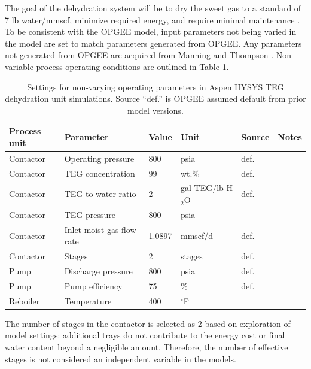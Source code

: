 \documentclass[11pt]{report}
\begin{document}
The goal of the dehydration system will be to dry the sweet gas to a standard of 7 lb water/mmscf, minimize required energy, and require minimal maintenance \cite{Manning1991}. To be consistent with the OPGEE model, input parameters not being varied in the model are set to match parameters generated from OPGEE. Any parameters not generated from OPGEE are acquired from Manning and Thompson \cite{Manning1991}.  Non-variable process operating conditions are outlined in Table \ref{tab:TEG_Aspen_Settings}.

\begin{table}
\begin{scriptsize}
\caption{Settings for non-varying operating parameters in Aspen HYSYS TEG dehydration unit simulations. Source ``def.'' is OPGEE assumed default from prior model versions.}
\label{tab:TEG_Aspen_Settings}
\begin{tabular*}{1\columnwidth}{p{}p{}p{}p{}p{}p{}}
\toprule
Process unit & Parameter & Value & Unit & Source & Notes \\
\midrule
Contactor &	Operating pressure 		&	800 		& 	psia					& def.	 			&\\
Contactor &	TEG concentration 		&	99	 	&	wt.\% 				& def.	 			& \\
Contactor &	TEG-to-water ratio 		&	2 		&	gal TEG/lb H$_2$O 		& def. 				&  \\
Contactor &	TEG pressure 			&	800 		&	psia 					& \cite{Manning1991} 	&\\
Contactor &	Inlet moist gas flow rate 	&	1.0897	&	mmscf/d 				& def.				& \\
Contactor &	Stages 				&	2		&	stages 				& def.				& \\
\midrule
Pump 	&	Discharge pressure		&	800 		&	psia 					& def.		&\\
Pump 	&	Pump efficiency 		&	75 		&	\%					& def.	& \\
\midrule
Reboiler 	&	Temperature 			&	400 		&	$^\circ$F 				&	\cite{Manning1991}	& \\
\bottomrule
\end{tabular*}
\end{scriptsize}
\end{table}

The number of stages in the contactor is selected as 2 based on exploration of model settings: additional trays do not contribute to the energy cost or final water content beyond a negligible amount. Therefore, the number of effective stages is not considered an independent variable in the models. 
\end{document}
